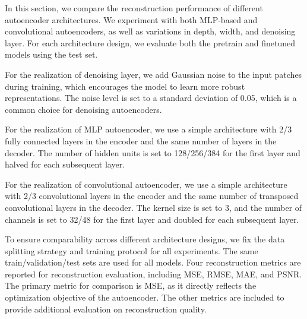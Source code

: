 \documentclass[10pt,letterpaper]{article}
\begin{document}
In this section, we compare the reconstruction performance of different autoencoder architectures. We experiment with both MLP-based and convolutional autoencoders, as well as variations in depth, width, and denoising layer. For each architecture design, we evaluate both the pretrain and finetuned models using the test set.

For the realization of denoising layer, we add Gaussian noise to the input patches during training, which encourages the model to learn more robust representations. The noise level is set to a standard deviation of 0.05, which is a common choice for denoising autoencoders.

For the realization of MLP autoencoder, we use a simple architecture with 2/3 fully connected layers in the encoder and the same number of layers in the decoder. The number of hidden units is set to 128/256/384 for the first layer and halved for each subsequent layer.

For the realization of convolutional autoencoder, we use a simple architecture with 2/3 convolutional layers in the encoder and the same number of transposed convolutional layers in the decoder. The kernel size is set to 3, and the number of channels is set to 32/48 for the first layer and doubled for each subsequent layer.

To ensure comparability across different architecture designs, we fix the data splitting strategy and training protocol for all experiments. The same train/validation/test sets are used for all models. Four reconstruction metrics are reported for reconstruction evaluation, including MSE, RMSE, MAE, and PSNR. The primary metric for comparison is MSE, as it directly reflects the optimization objective of the autoencoder. The other metrics are included to provide additional evaluation on reconstruction quality.
\end{document}
